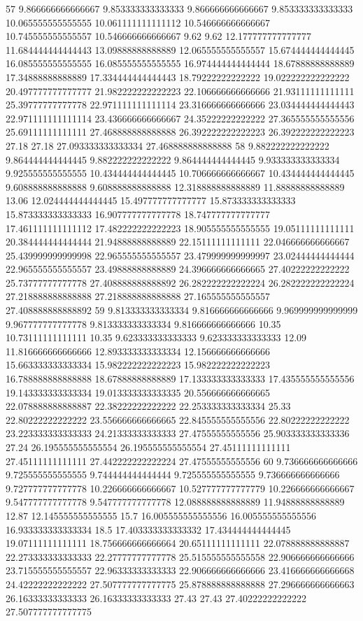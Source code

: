 57 9.866666666666667 9.853333333333333 9.866666666666667 9.853333333333333 10.065555555555555 10.061111111111112 10.546666666666667 10.745555555555557 10.546666666666667 9.62 9.62 12.177777777777777 11.684444444444443 13.09888888888889 12.065555555555557 15.674444444444445 16.085555555555555 16.085555555555555 16.974444444444444 18.67888888888889 17.34888888888889 17.334444444444443 18.79222222222222 19.022222222222222 20.497777777777777 21.982222222222223 22.106666666666666 21.93111111111111 25.39777777777778 22.971111111111114 23.316666666666666 23.034444444444443 22.971111111111114 23.436666666666667 24.35222222222222 27.365555555555556 25.69111111111111 27.468888888888888 26.392222222222223 26.392222222222223 27.18 27.18 27.093333333333334 27.468888888888888
58 9.882222222222222 9.864444444444445 9.882222222222222 9.864444444444445 9.933333333333334 9.925555555555555 10.434444444444445 10.706666666666667 10.434444444444445 9.608888888888888 9.608888888888888 12.318888888888889 11.88888888888889 13.06 12.024444444444445 15.497777777777777 15.873333333333333 15.873333333333333 16.907777777777778 18.747777777777777 17.461111111111112 17.482222222222223 18.905555555555555 19.05111111111111 20.384444444444444 21.94888888888889 22.15111111111111 22.046666666666667 25.439999999999998 22.965555555555557 23.479999999999997 23.02444444444444 22.965555555555557 23.49888888888889 24.396666666666665 27.40222222222222 25.73777777777778 27.408888888888892 26.282222222222224 26.282222222222224 27.218888888888888 27.218888888888888 27.165555555555557 27.408888888888892
59 9.813333333333334 9.816666666666666 9.969999999999999 9.967777777777778 9.813333333333334 9.816666666666666 10.35 10.73111111111111 10.35 9.623333333333333 9.623333333333333 12.09 11.816666666666666 12.893333333333334 12.156666666666666 15.663333333333334 15.982222222222223 15.982222222222223 16.788888888888888 18.67888888888889 17.133333333333333 17.435555555555556 19.143333333333334 19.013333333333335 20.556666666666665 22.078888888888887 22.38222222222222 22.253333333333334 25.33 22.80222222222222 23.556666666666665 22.845555555555556 22.80222222222222 23.223333333333333 24.21333333333333 27.47555555555556 25.903333333333336 27.24 26.195555555555554 26.195555555555554 27.45111111111111 27.45111111111111 27.442222222222224 27.47555555555556
60 9.736666666666666 9.725555555555555 9.744444444444444 9.725555555555555 9.736666666666666 9.727777777777778 10.226666666666667 10.527777777777779 10.226666666666667 9.547777777777778 9.547777777777778 12.088888888888889 11.94888888888889 12.87 12.145555555555555 15.7 16.005555555555556 16.005555555555556 16.933333333333334 18.5 17.403333333333332 17.434444444444445 19.07111111111111 18.756666666666664 20.65111111111111 22.078888888888887 22.273333333333333 22.27777777777778 25.515555555555558 22.906666666666666 23.715555555555557 22.96333333333333 22.906666666666666 23.416666666666668 24.42222222222222 27.507777777777775 25.878888888888888 27.296666666666663 26.16333333333333 26.16333333333333 27.43 27.43 27.40222222222222 27.507777777777775
